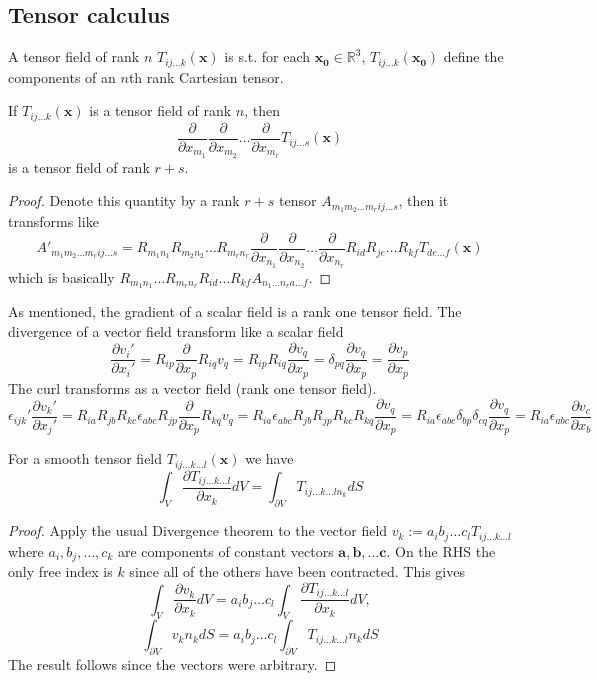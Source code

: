\documentclass[a4paper]{article}
\begin{document}
\subsection{Tensor calculus}
\begin{defi}
A tensor field of rank $n$ $T_{ij\dots k}(\mathbf{x})$ is s.t. for each $\mathbf{x_0}\in\mathbb{R}^3$, $T_{ij\dots k}(\mathbf{x_0})$ define the components of an $n$th rank Cartesian tensor.
\end{defi}
\begin{prop}
If $T_{ij\dots k}(\mathbf{x})$ is a tensor field of rank $n$, then
$$\frac{\partial}{\partial x_{m_1}}\frac{\partial}{\partial x_{m_2}}\dots\frac{\partial}{\partial x_{m_r}}T_{ij\dots s}(\mathbf{x})$$
is a tensor field of rank $r+s$.
\end{prop}
\begin{proof}
Denote this quantity by a rank $r+s$ tensor $A_{m_1m_2\dots m_rij\dots s}$, then it transforms like
$$A'_{m_1m_2\dots m_rij\dots s}=R_{m_1n_1}R_{m_2n_2}\dots R_{m_rn_r}\frac{\partial}{\partial x_{n_1}}\frac{\partial}{\partial x_{n_2}}\dots\frac{\partial}{\partial x_{n_r}}R_{id}R_{je}\dots R_{kf}T_{de\dots f}(\mathbf{x})$$
which is basically $R_{m_1n_1}\dots R_{m_rn_r}R_{id}\dots R_{kf}A_{n_1\dots n_ra\dots f}$.
\end{proof}
\begin{eg}
As mentioned, the gradient of a scalar field is a rank one  tensor field. The divergence of a vector field transform like a scalar field
$$\frac{\partial v_i'}{\partial x_i'}=R_{ip}\frac{\partial}{\partial x_p}R_{iq}v_q=R_{ip}R_{iq}\frac{\partial v_q}{\partial x_p}=\delta_{pq}\frac{\partial v_q}{\partial x_p}=\frac{\partial v_p}{\partial x_p}$$
The curl transforms as a vector field (rank one tensor field).
$$\epsilon_{ijk}'\frac{\partial v_k'}{\partial x_j'}=R_{ia}R_{jb}R_{kc}\epsilon_{abc}R_{jp}\frac{\partial}{\partial x_p}R_{kq}v_q=R_{ia}\epsilon_{abc}R_{jb}R_{jp}R_{kc}R_{kq}\frac{\partial v_q}{\partial x_p}=R_{ia}\epsilon_{abc}\delta_{bp}\delta_{cq}\frac{\partial v_q}{\partial x_p}=R_{ia}\epsilon_{abc}\frac{\partial v_c}{\partial x_b}$$
\end{eg}
\begin{prop}
For a smooth tensor field $T_{ij\dots k\dots l}(\mathbf{x})$ we have
$$\int_V\frac{\partial T_{ij\dots k\dots l}}{\partial x_k}dV=\int_{\partial V}T_{ij\dots k\dots ln_k}dS$$
\end{prop}
\begin{proof}
Apply the usual Divergence theorem to the vector field $v_k:=a_ib_j\dots c_lT_{ij\dots k\dots l}$ where $a_i,b_j,\dots,c_k$ are components of constant vectors $\mathbf{a},\mathbf{b},\dots\mathbf{c}$. On the RHS the only free index is $k$ since all of the others have been contracted. This gives
$$\int_V\frac{\partial v_k}{\partial x_k}dV=a_ib_j\dots c_l\int_V\frac{\partial T_{ij\dots k\dots l}}{\partial x_k}dV,$$
$$\int_{\partial V}v_kn_kdS=a_ib_j\dots c_l\int_{\partial V}T_{ij\dots k\dots l}n_kdS$$
The result follows since the vectors were arbitrary. 
\end{proof}
\end{document}

